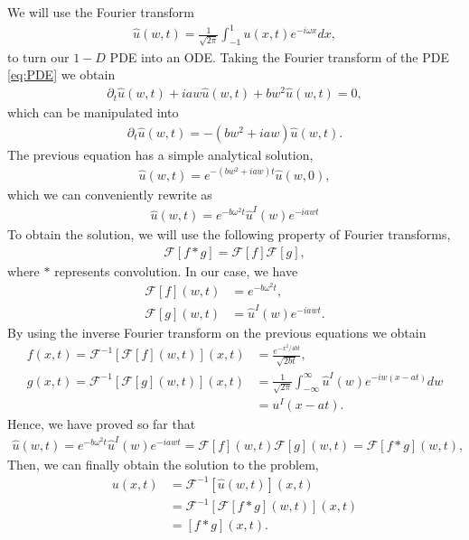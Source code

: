 \begin{questions}
\begin{solution}
We will use the Fourier transform 
\begin{align}\label{eq:FourierTransf}
\hat{u}(w,t)=\frac{1}{\sqrt{2\pi}}\int_{-1}^{1}u(x,t)e^{-i\omega x}dx,
\end{align}
to turn our $1-D$ PDE into an ODE. Taking the Fourier transform of the PDE \eqref{eq:PDE} we obtain
\begin{align*}
\partial_t\hat{u}(w,t)+iaw\hat{u}(w,t)+bw^2\hat{u}(w,t)=0,
\end{align*} 
which can be manipulated into
\begin{align*}
\partial_t\hat{u}(w,t)=-(bw^2+iaw)\hat{u}(w,t).
\end{align*}
The previous equation has a simple analytical solution,
\begin{align*}
\hat{u}(w,t)=e^{-(bw^2+iaw)t}\hat{u}(w,0),
\end{align*}
which we can conveniently rewrite as
\begin{align}\label{eq:freqDomSol}
\hat{u}(w,t)=e^{-b\omega^2t}\hat{u}^I(w)e^{-iawt}
\end{align}
To obtain the solution, we will use the following property of Fourier transforms,
\begin{align}
\mathcal{F}\left[f*g\right] = \mathcal{F}\left[f\right] \mathcal{F}\left[g\right],
\end{align}
where $*$ represents convolution. In our case, we have
\begin{align*}
\mathcal{F}\left[f\right](w,t) &= e^{-b\omega^2t},\\
\mathcal{F}\left[g\right](w,t) &= \hat{u}^I(w)e^{-iawt}.
\end{align*}
By using the inverse Fourier transform on the previous equations we obtain
\begin{align}\label{eq:convPartF}
f(x,t)=\mathcal{F}^{-1}\left[\mathcal{F}\left[f\right](w,t)\right](x,t) &= \frac{e^{-x^2/4bt}}{\sqrt{2bt}},\\
g(x,t)=\mathcal{F}^{-1}\left[\mathcal{F}\left[g\right](w,t)\right](x,t) &= \frac{1}{\sqrt{2\pi}}\int_{-\infty}^{\infty}\hat{u}^I(w)e^{-iw(x-at)}dw\nonumber\\ \nonumber
& = u^I(x-at).
\end{align}
Hence, we have proved so far that
\begin{align}
\hat{u}(w,t)=e^{-b\omega^2t}\hat{u}^I(w)e^{-iawt} = \mathcal{F}\left[f\right](w,t) \mathcal{F}\left[g\right](w,t)=\mathcal{F}\left[f*g\right](w,t),
\end{align}
Then, we can finally obtain the solution to the problem,
\begin{align*}
u(x,t)&=\mathcal{F}^{-1}\left[\hat{u}(w,t)\right](x,t)\\
& =\mathcal{F}^{-1}\left[\mathcal{F}\left[f*g\right](w,t)\right](x,t)\\
& =\left[f*g\right](x,t).
\end{align*}


\end{solution}
\end{questions}
